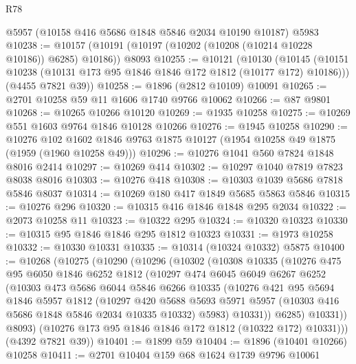 \begin{lexlean}{R78}
\begin{coremodule}
    @5957
    (@10158 @416 @5686 @1848 @5846 @2034 @10190 @10187)
    @5983
@10238 := @10157 (@10191 (@10197 (@10202 (@10208 (@10214 @10228 @10186)) @6285) @10186)) @8093
@10255 := @10121
    (@10130
      (@10145 (@10151 @10238 (@10131 @173 @95 @1846 @1846 @172 @1812 (@10177 @172) @10186)))
      (@4455 @7821 @39))
@10258 := @1896 (@2812 @10109) @10091
@10265 := @2701 @10258 @59 @11 @1606 @1740 @9766 @10062
@10266 := @87 @9801
@10268 := @10265 @10266 @10120
@10269 := @1935 @10258
@10275 := @10269 @551 @1603 @9764 @1846 @10128 @10266
@10276 := @1945 @10258
@10290 := @10276
    @102
    @1602
    @1846
    @9763
    @1875
    @10127
    (@1954 @10258 @49 @1875 (@1959 (@1960 @10258 @49)))
@10296 := @10276 @1041 @560 @7824 @1848 @8016 @2414
@10297 := @10269 @414
@10302 := @10297 @1040 @7819 @7823 @8038 @8016
@10303 := @10276 @418
@10308 := @10303 @1039 @5686 @7818 @5846 @8037
@10314 := @10269 @180 @417 @1849 @5685 @5863 @5846
@10315 := @10276 @296
@10320 := @10315 @416 @1846 @1848 @295 @2034
@10322 := @2073 @10258 @11
@10323 := @10322 @295
@10324 := @10320 @10323
@10330 := @10315 @95 @1846 @1846 @295 @1812 @10323
@10331 := @1973 @10258
@10332 := @10330 @10331
@10335 := @10314 (@10324 @10332) @5875
@10400 := @10268
    (@10275
      (@10290
        (@10296
          (@10302
            (@10308
              @10335
              (@10276
                @475
                @95
                @6050
                @1846
                @6252
                @1812
                (@10297
                  @474
                  @6045
                  @6049
                  @6267
                  @6252
                  (@10303
                    @473
                    @5686
                    @6044
                    @5846
                    @6266
                    @10335
                    (@10276
                      @421
                      @95
                      @5694
                      @1846
                      @5957
                      @1812
                      (@10297
                        @420
                        @5688
                        @5693
                        @5971
                        @5957
                        (@10303 @416 @5686 @1848 @5846 @2034 @10335 @10332)
                        @5983)
                      @10331))
                  @6285)
                @10331))
            @8093)
          (@10276 @173 @95 @1846 @1846 @172 @1812 (@10322 @172) @10331)))
      (@4392 @7821 @39))
@10401 := @1899 @59
@10404 := @1896 (@10401 @10266) @10258
@10411 := @2701 @10404 @159 @68 @1624 @1739 @9796 @10061

\end{coremodule}
\end{lexlean}
